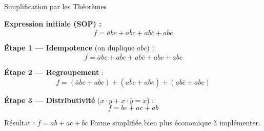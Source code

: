 \begin{frame}{Simplification par les Théorèmes}

    \textbf{Expression initiale (SOP) :}
    \[
        f = \bar{a}bc + a\bar{b}c + ab\bar{c} + abc
    \]

    \vspace{0.3cm}

    \textbf{Étape 1 — Idempotence} (on duplique \(abc\)) :
    \[
        f = \bar{a}bc + a\bar{b}c + ab\bar{c} + abc + abc
    \]

    \vspace{0.2cm}

    \textbf{Étape 2 — Regroupement} :
    \[
        f = (\bar{a}bc + abc) + (a\bar{b}c + abc) + (ab\bar{c} + abc)
    \]

    \vspace{0.2cm}

    \textbf{Étape 3 — Distributivité} (\(x \cdot y + x \cdot \bar{y} = x\)) :
    \[
        f = bc + ac + ab
    \]

    \vspace{0.1cm}

    \begin{exampleblock}{Résultat : $f = ab + ac + bc$}
        Forme simplifiée bien plus économique à implémenter.
    \end{exampleblock}

\end{frame}


